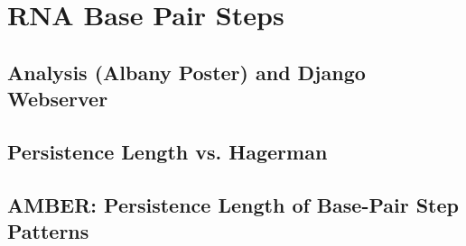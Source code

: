\chapter{RNA Base Pair Steps}
\label{basepairsteps} 

\section{Analysis (Albany Poster) and Django Webserver}
\section{Persistence Length vs. Hagerman}
\section{AMBER: Persistence Length of Base-Pair Step Patterns}


